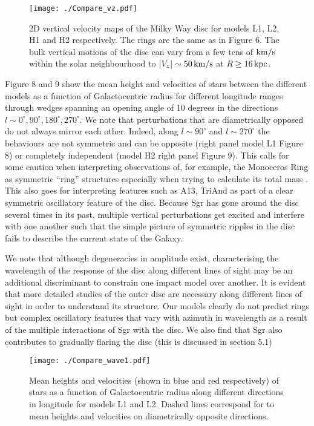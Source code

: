 \documentclass[useAMS,usenatbib]{mnras}
\begin{document}
\begin{figure}
\texttt{[image: ./Compare\_vz.pdf]}
\caption[]{2D vertical velocity maps of the Milky Way disc for models L1, L2, H1 and H2 respectively. The rings are the same as in Figure 6. The bulk vertical motions of the disc can vary from a few tens of $\rm{km/s}$ within the solar neighbourhood to $|V_{z}|\sim50\,\rm{km/s}$ at $R\geq16\,\rm{kpc}$.}
\end{figure}

Figure 8 and 9 show the mean height and velocities of stars between the different models as a function of Galactocentric radius for different longitude ranges through wedges spanning an opening angle of 10 degrees in the directions $l\sim 0^{\circ}, 90^{\circ}, 180^{\circ}, 270^{\circ}$. We note that perturbations that are diametrically opposed do not always mirror each other. Indeed, along $l\sim90^{\circ}$ and $l\sim 270^{\circ}$ the behaviours are not symmetric and can be opposite (right panel model L1 Figure 8) or completely independent (model H2 right panel Figure 9). This calls for some caution when interpreting observations of, for example, the Monoceros Ring as symmetric ``ring'' structures especially when trying to calculate its total mass \citep{morganson16}. This also goes for interpreting features such as A13, TriAnd as part of a clear symmetric oscillatory feature of the disc. Because Sgr has gone around the disc several times in its past, multiple vertical perturbations get excited and interfere with one another such that the simple picture of symmetric ripples in the disc fails to describe the current state of the Galaxy. 

We note that although degeneracies in amplitude exist, characterising the wavelength of the response of the disc  along different lines of sight may be an additional discriminant to constrain one impact model over another. It is evident that more detailed studies of the outer disc are necessary along different lines of sight in order to understand its structure. Our models clearly do not predict rings but complex oscillatory features that vary with azimuth in wavelength as a result of the multiple interactions of Sgr with the disc. We also find that Sgr also contributes to gradually flaring the disc (this is discussed in section 5.1)

\begin{figure}
\texttt{[image: ./Compare\_wave1.pdf]}
\caption[]{Mean heights and velocities (shown in blue and red respectively) of stars as a function of Galactocentric radius along different directions in longitude for models L1 and L2. Dashed lines correspond for to mean heights and velocities on diametrically opposite directions.}
\end{figure}
\end{document}
